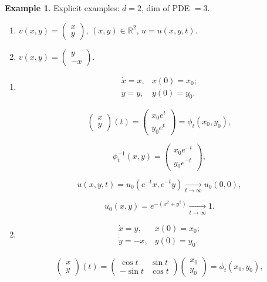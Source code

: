 \documentclass[12pt]{article}
\theoremstyle{definition}
\newtheorem*{example*}{Example}
\begin{document}
\begin{example*}
Explicit examples: $d=2$, dim of PDE $=3$.

\begin{enumerate}[label=\arabic*)]
\item $v(x,y)=\left(\begin{matrix}x\\y\end{matrix}\right)$, $(x,y)\in\mathbb{R}^2$, $u=u(x,y,t)$.

\item $v(x,y)=\left(\begin{matrix}y\\-x\end{matrix}\right)$.
\end{enumerate}

\begin{enumerate}[label=\arabic*)]
\item
\[
\begin{array}{ll}
\dot{x}=x,&x(0)=x_0;\\\dot{y}=y,&y(0)=y_0.
\end{array}
\]

\[\left(\begin{matrix}x\\y\end{matrix}\right)(t)=\left(\begin{matrix}x_0e^t\\y_0e^t\end{matrix}\right)=\phi_t(x_0,y_0),\]

\[\phi_t^{-1}(x,y)=\left(\begin{matrix}x_0e^{-t}\\y_0e^{-t}\end{matrix}\right),\]

\[u(x,y,t)=u_0(e^{-t}x,e^{-t}y)\xrightarrow[t\to\infty]{}u_0(0,0),\]

\[u_0(x,y)=e^{-(x^2+y^2)}\xrightarrow[t\to\infty]{}1.\]

\item
\[
\begin{array}{ll}
\dot{x}=y,&x(0)=x_0;\\
\dot{y}=-x,&y(0)=y_0.
\end{array}
\]

\[\left(\begin{matrix}x\\y\end{matrix}\right)(t)=\left(\begin{matrix}\cos t&\sin t\\-\sin t&\cos t\end{matrix}\right)\left(\begin{matrix}x_0\\y_0\end{matrix}\right)=\phi_t(x_0,y_0),\]


\end{enumerate}
\end{example*}
\end{document}
